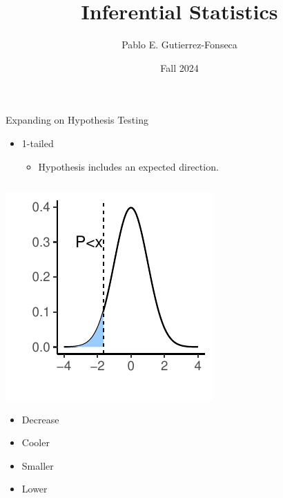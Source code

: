 \documentclass[
  ignorenonframetext,
]{beamer}
\title{Inferential Statistics}
\author{Pablo E. Gutierrez-Fonseca}
\date{Fall 2024}
\providecommand{\tightlist}{%
  \setlength{\itemsep}{0pt}\setlength{\parskip}{0pt}}
\begin{document}
\frame{\titlepage}

\begin{frame}{Expanding on Hypothesis Testing}
\label{expanding-on-hypothesis-testing}
\begin{itemize}
\tightlist
\item
  1-tailed

  \begin{itemize}
  \tightlist
  \item
    Hypothesis includes an expected direction.
  \end{itemize}
\end{itemize}

\begin{columns}[T]
\begin{column}{0.5\textwidth}
\vspace{1cm}

\includegraphics{Inferential-Stat-and-Z-test_files/figure-beamer/unnamed-chunk-1-1.pdf}

\centering

\tiny

\begin{itemize}
\tightlist
\item
  Decrease
\item
  Cooler
\item
  Smaller
\item
  Lower\\
\end{itemize}

\hfill\break
\end{column}

\begin{column}{0.5\textwidth}
\vspace{1cm}


\end{column}
\end{columns}
\end{frame}
\end{document}
